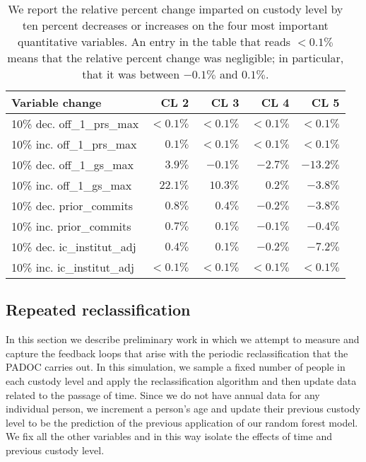 \documentclass{amsproc}
\numberwithin{equation}{section}
\theoremstyle{plain}
\theoremstyle{remark}
\begin{document}
\begin{table}
\begin{tabular}{|l||r|r|r|r|}\hline
Variable change  & CL 2  & CL 3 & CL 4 & CL 5\\\hline
10\% dec. off\_1\_prs\_max & $< 0.1 \%$ & $< 0.1 \%$ & $< 0.1 \%$ & $< 0.1 \%$ \\\hline
10\% inc. off\_1\_prs\_max & $ 0.1 \%$ & $< 0.1 \%$ & $< 0.1 \%$ & $< 0.1 \%$ \\\hline\hline
10\% dec. off\_1\_gs\_max & $3.9 \%$ & $ -0.1 \%$ & $ -2.7 \%$ & $ -13.2 \%$ \\\hline
10\% inc. off\_1\_gs\_max & $22.1 \%$ & $10.3 \%$ & $ 0.2 \%$ & $-3.8 \%$ \\\hline\hline
10\% dec. prior\_commits & $0.8 \%$ & $ 0.4 \%$ & $-0.2 \%$ & $ -3.8 \%$ \\\hline
10\% inc. prior\_commits & $0.7 \%$ & $0.1 \%$ & $ -0.1 \%$ & $-0.4 \%$ \\\hline\hline
10\% dec. ic\_institut\_adj & $0.4 \%$ & $ 0.1 \%$ & $ -0.2 \%$ & $ -7.2 \%$ \\\hline
10\% inc. ic\_institut\_adj & $<0.1 \%$ & $<0.1 \%$ & $ <0.1 \%$ & $<0.1 \%$ \\\hline
\end{tabular}
\caption{We report the relative percent change imparted on custody level by ten percent decreases or increases on the four most important quantitative variables.  An entry in the table that reads $<0.1\%$ means that the relative percent change was negligible;  in particular, that it was between $-0.1\%$ and $0.1\%$.}\label{tbl:sa}
\end{table}


\subsection{Repeated reclassification}

In this section we describe preliminary work in which we attempt to measure and capture the feedback loops that arise with the periodic reclassification that the PADOC carries out.  In this simulation, we sample a fixed number of people in each custody level  and apply the reclassification algorithm and then update data related to the passage of time.  Since we do not have annual data for any individual person, we increment a person's age and update their previous custody level to be the prediction of the previous application of our random forest model.  We fix all the other variables and in this way isolate the effects of time and previous custody level.
\end{document}
